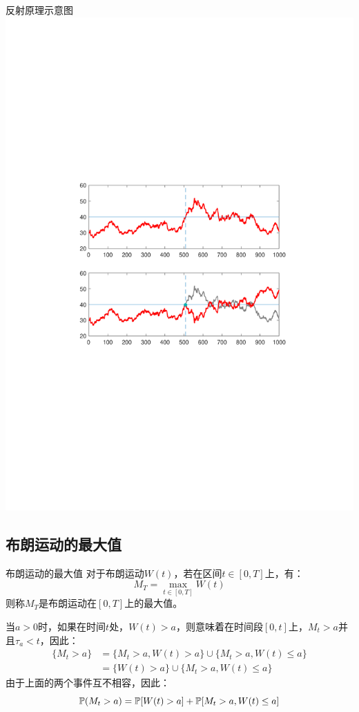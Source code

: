 \documentclass[t]{beamer}
\renewcommand{\Pr}{\mathbb{P}}
\begin{document}
\begin{frame}{反射原理示意图}
  \centering
	\includegraphics[scale=.7]{fig/barrier.pdf}
\end{frame}

\subsection{布朗运动的最大值}
\begin{frame}{布朗运动的最大值}
  对于布朗运动$W(t)$，若在区间$t\in[0,T]$上，有：
  $$M_T=\max_{t\in [0,T]}W(t)$$
    则称$M_T$是布朗运动在$[0,T]$上的最大值。

    当$a>0$时，如果在时间$t$处，$W(t)>a$，则意味着在时间段$[0,t]$上，$M_t>a$并且$\tau_a<t$，因此：
\begin{equation*}
\begin{split}
\{M_t>a\}&=\{M_t>a,W(t)>a\}\cup\{M_t>a, W(t)\le a\}\\
&=\{W(t)>a\}\cup\{M_t>a, W(t)\le a\}
\end{split}
\end{equation*}
由于上面的两个事件互不相容，因此：
\begin{equation*}
\Pr(M_t>a)=\Pr\qty[W(t)>a]+\Pr\qty[M_t>a, W(t)\le a]
\end{equation*}
\end{frame}
\end{document}
